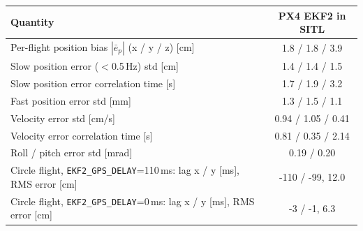 \begin{tabular}{lc}\toprule
Quantity & PX4 EKF2 in SITL\\\midrule
Per-flight position bias $|\bar e_p|$ (x / y / z) [cm] & 1.8 / 1.8 / 3.9\\
Slow position error ($<$0.5\,Hz) std [cm] & 1.4 / 1.4 / 1.5\\
Slow position error correlation time [s] & 1.7 / 1.9 / 3.2\\
Fast position error std [mm] & 1.3 / 1.5 / 1.1\\
Velocity error std [cm/s] & 0.94 / 1.05 / 0.41\\
Velocity error correlation time [s] & 0.81 / 0.35 / 2.14\\
Roll / pitch error std [mrad] & 0.19 / 0.20\\
Circle flight, \texttt{EKF2\_GPS\_DELAY}=110\,ms: lag x / y [ms], RMS error [cm] & -110 / -99, 12.0\\
Circle flight, \texttt{EKF2\_GPS\_DELAY}=0\,ms: lag x / y [ms], RMS error [cm] & -3 / -1, 6.3\\
\bottomrule\end{tabular}
